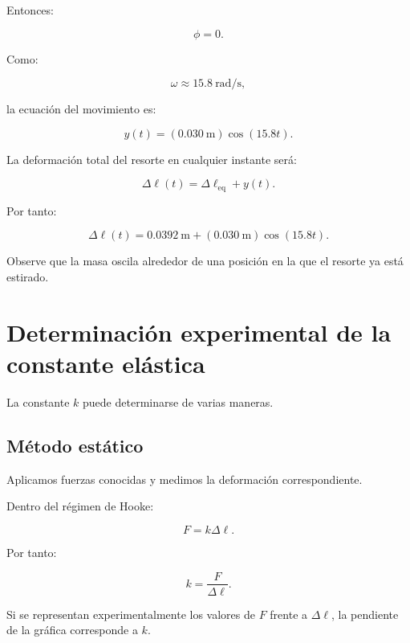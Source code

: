 Entonces:

\[ \phi=0. \]

Como:

\[ \omega\approx\SI{15.8}{\radian\per\second}, \]

la ecuación del movimiento es:

\[ \boxed{y(t)=(\SI{0.030}{\meter})\cos(15.8t)}. \]

La deformación total del resorte en cualquier instante será:

\[ \Delta\ell(t)=\Delta\ell_{\mathrm{eq}}+y(t). \]

Por tanto:

\[ \boxed{\Delta\ell(t)=\SI{0.0392}{\meter}+(\SI{0.030}{\meter})\cos(15.8t)}. \]

Observe que la masa oscila alrededor de una posición en la que el resorte ya está estirado.


\section{Determinación experimental de la constante elástica}

La constante \(k\) puede determinarse de varias maneras.


\subsection{Método estático}

Aplicamos fuerzas conocidas y medimos la deformación correspondiente.

Dentro del régimen de Hooke:

\[ F=k\Delta\ell. \]

Por tanto:

\[ \boxed{k=\frac{F}{\Delta\ell}}. \]

Si se representan experimentalmente los valores de \(F\) frente a \(\Delta\ell\), la pendiente de la gráfica corresponde a \(k\).

\begin{center}
\end{center}

